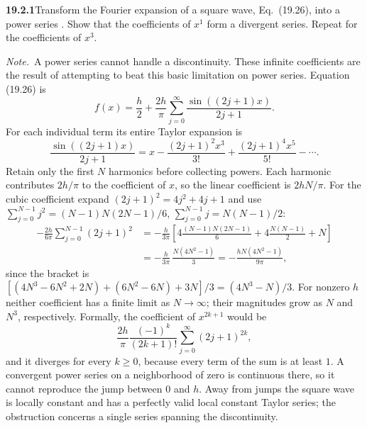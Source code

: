 \par\bigskip
\noindent\textbf{19.2.1}\quad Transform the Fourier expansion of a
square wave, Eq.~(19.26), into a power series .
Show that the coefficients of $x^{1}$ form a divergent series. Repeat
for the coefficients of $x^{3}$.
\par\emph{Note.}~A power series cannot handle a discontinuity.
These infinite coefficients are the result of attempting to beat
this basic limitation on power series.
\solution
Equation (19.26) is
\[
f(x)=\frac h2+\frac{2h}{\pi}\sum_{j=0}^{\infty}
\frac{\sin((2j+1)x)}{2j+1}.
\]
For each individual term its entire Taylor expansion is
\[
\frac{\sin((2j+1)x)}{2j+1}
=x-\frac{(2j+1)^2x^3}{3!}
+\frac{(2j+1)^4x^5}{5!}-\cdots.
\]
Retain only the first $N$ harmonics before collecting powers. Each
harmonic contributes $2h/\pi$ to the coefficient of $x$, so the linear
coefficient is $2hN/\pi$. For the cubic coefficient expand
$(2j+1)^2=4j^2+4j+1$ and use
$\sum_{j=0}^{N-1}j^2=(N-1)N(2N-1)/6$,
$\sum_{j=0}^{N-1}j=N(N-1)/2$:
\begin{align*}
-\frac{2h}{6\pi}\sum_{j=0}^{N-1}(2j+1)^2
&=-\frac{h}{3\pi}
\left[4\frac{(N-1)N(2N-1)}6
+4\frac{N(N-1)}2+N\right]\\
&=-\frac{h}{3\pi}\,\frac{N(4N^2-1)}3
=-\frac{hN(4N^2-1)}{9\pi},
\end{align*}
since the bracket is
$[(4N^3-6N^2+2N)+(6N^2-6N)+3N]/3=(4N^3-N)/3$.
For nonzero $h$ neither coefficient has a finite limit as $N\to\infty$;
their magnitudes grow as $N$ and $N^3$, respectively. Formally, the coefficient of
$x^{2k+1}$ would be
\[
\frac{2h}{\pi}\frac{(-1)^k}{(2k+1)!}
\sum_{j=0}^{\infty}(2j+1)^{2k},
\]
and it diverges for every $k\ge0$, because every term of the sum is at
least $1$.
A convergent power series on a neighborhood of zero is continuous
there, so it cannot reproduce the jump between $0$ and $h$.
Away from jumps the square wave is locally constant and has a perfectly
valid local constant Taylor series; the obstruction concerns a single
series spanning the discontinuity.

